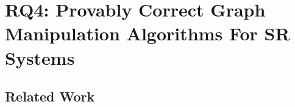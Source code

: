 \chapter{RQ4: Provably Correct Graph Manipulation Algorithms For SR Systems}%
\label{chap:RQ4}

\section{Related Work}\label{RQ4:sec:rw}


